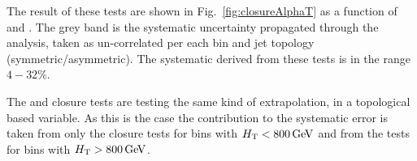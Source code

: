 The result of these tests are shown in Fig.~\ref{fig:closureAlphaT} as
a function of \scalht and \njet.  The grey band is the systematic
uncertainty propagated through the analysis, taken as un-correlated
per each \scalht bin and jet topology (symmetric/asymmetric). The
systematic derived from these tests is in the range $4-32\%$.

The \bdphi and \alphat closure tests are testing the same kind of
extrapolation, in a topological \met based variable. As this is the
case the contribution to the systematic error is taken from only the
\alphat closure tests for bins with $\mbox{$H_\text{T}$}<800\mathrm{\,Ge\kern -0.1em V}$ and from the
\bdphi tests for bins with $\mbox{$H_\text{T}$}>800\mathrm{\,Ge\kern -0.1em V}$.

\begin{figure}[h!]
  \begin{center}
    ~~
    \\
    ~~


\end{center}
\end{figure}
